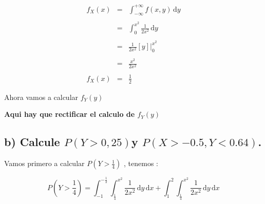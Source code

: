 \documentclass[12pt]{article}
\begin{document}
    \begin{equation*}
        \begin{array}{rcl}
            \displaystyle f_{X}\left(x\right) & = & \displaystyle \int_{-\infty}^{+ \infty} f \left(x,y\right) \,\mathrm{d}y
            \\
            \\
            & =  & \displaystyle \int_{0}^{x^2} \frac{1}{2x^2} \,\mathrm{d}y   
            \\
            \\
            & = & \displaystyle \frac{1}{2x^2} \left[y\right] \vert_{0}^{x^2}
            \\
            \\
            & = & \displaystyle \frac{x^2}{2x^2}
            \\
            \\
            \displaystyle f_{X}\left(x\right) & = & \frac{1}{2} 
        \end{array}
    \end{equation*}

    \begin{flushleft}
        Ahora vamos a calcular $f_{Y} \left(y\right)$
    \end{flushleft}

    

    \begin{center}
         {\bf Aqui hay que rectificar el calculo de $f_{Y}\left(y\right)$} 
    \end{center}


    \subsection*{b) Calcule  $P\left(Y > 0,25 \right) $y $P \left(X > −0.5, Y < 0.64\right)$.}
    
    \vspace{0.5cm}
    \begin{flushleft}
        Vamos primero a calcular $P \left(Y > \frac{1}{4}\right)$ , tenemos : 
    \end{flushleft}

    \begin{equation*}
        P\left(Y>\frac{1}{4}\right) = \displaystyle \int_{-1}^{- \frac{1}{2}} \int_{\frac{1}{4}}^{x^2} \frac{1}{2x^2} \,\mathrm{d}y  \,\mathrm{d}x  + \int_{1}^{2} \int_{\frac{1}{4}}^{x^2} \frac{1}{2x^2} \,\mathrm{d}y  \,\mathrm{d}x 
    \end{equation*}
\end{document}

